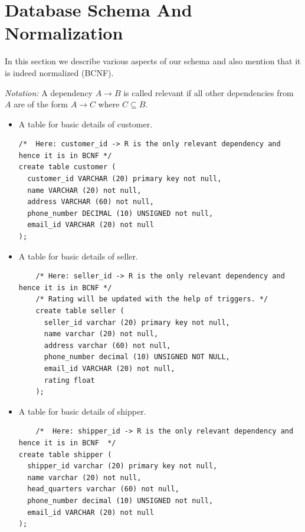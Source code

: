 \documentclass[a4paper,12pt]{article}
\newcommand{\ita}[1]{
    \textit{#1}
}
\begin{document}
\section{Database Schema And Normalization}
In this section we describe various aspects of our schema and also mention that it is indeed normalized (BCNF).

\ita{Notation: }A dependency $A \rightarrow B$ is called relevant if all other dependencies from $A$ are of the form $A \rightarrow C$ where $C \subseteq B$.

\begin{itemize}
  \item A table for basic details of customer.
  \begin{verbatim}
/*  Here: customer_id -> R is the only relevant dependency and hence it is in BCNF */
create table customer (
  customer_id VARCHAR (20) primary key not null,
  name VARCHAR (20) not null,
  address VARCHAR (60) not null,
  phone_number DECIMAL (10) UNSIGNED not null,
  email_id VARCHAR (20) not null
);
  \end{verbatim}
  \item A table for basic details of seller.
  \begin{verbatim}
    /* Here: seller_id -> R is the only relevant dependency and hence it is in BCNF */
    /* Rating will be updated with the help of triggers. */
    create table seller (
      seller_id varchar (20) primary key not null,
      name varchar (20) not null,
      address varchar (60) not null,
      phone_number decimal (10) UNSIGNED NOT NULL,
      email_id VARCHAR (20) not null,
      rating float
    );
  \end{verbatim}
  \item A table for basic details of shipper.
  \begin{verbatim}
    /*  Here: shipper_id -> R is the only relevant dependency and hence it is in BCNF  */
create table shipper (
  shipper_id varchar (20) primary key not null,
  name varchar (20) not null,
  head_quarters varchar (60) not null,
  phone_number decimal (10) UNSIGNED not null,
  email_id VARCHAR (20) not null
);


\end{verbatim}
\end{itemize}
\end{document}

